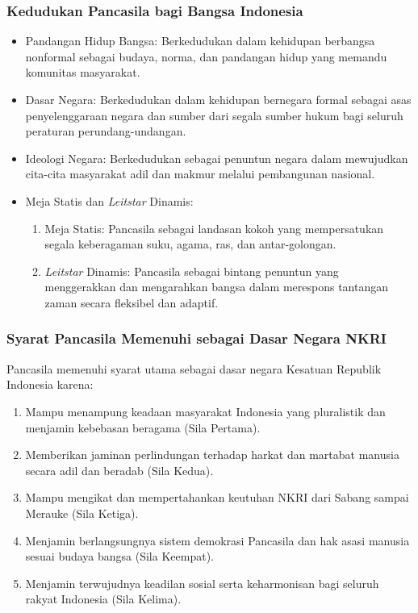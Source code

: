 \subsubsection{Kedudukan Pancasila bagi Bangsa Indonesia}

\begin{itemize}
\item Pandangan Hidup Bangsa: Berkedudukan dalam kehidupan berbangsa nonformal sebagai budaya, norma, dan pandangan hidup yang memandu komunitas masyarakat.
\item Dasar Negara: Berkedudukan dalam kehidupan bernegara formal sebagai asas penyelenggaraan negara dan sumber dari segala sumber hukum bagi seluruh peraturan perundang-undangan.
\item Ideologi Negara: Berkedudukan sebagai penuntun negara dalam mewujudkan cita-cita masyarakat adil dan makmur melalui pembangunan nasional.
\item Meja Statis dan \textit{Leitstar} Dinamis:
  \begin{enumerate}
  \item Meja Statis: Pancasila sebagai landasan kokoh yang mempersatukan segala keberagaman suku, agama, ras, dan antar-golongan.
  \item \textit{Leitstar} Dinamis: Pancasila sebagai bintang penuntun yang menggerakkan dan mengarahkan bangsa dalam merespons tantangan zaman secara fleksibel dan adaptif.
  \end{enumerate}
\end{itemize}

\subsubsection{Syarat Pancasila Memenuhi sebagai Dasar Negara NKRI}

Pancasila memenuhi syarat utama sebagai dasar negara Kesatuan Republik Indonesia karena:
\begin{enumerate}
\item Mampu menampung keadaan masyarakat Indonesia yang pluralistik dan menjamin kebebasan beragama (Sila Pertama).
\item Memberikan jaminan perlindungan terhadap harkat dan martabat manusia secara adil dan beradab (Sila Kedua).
\item Mampu mengikat dan mempertahankan keutuhan NKRI dari Sabang sampai Merauke (Sila Ketiga).
\item Menjamin berlangsungnya sistem demokrasi Pancasila dan hak asasi manusia sesuai budaya bangsa (Sila Keempat).
\item Menjamin terwujudnya keadilan sosial serta keharmonisan bagi seluruh rakyat Indonesia (Sila Kelima).
\end{enumerate}

